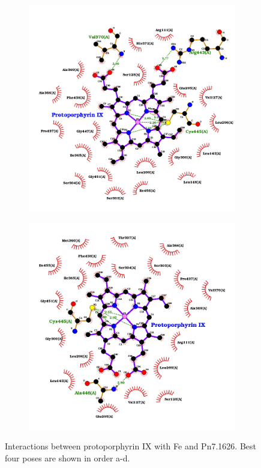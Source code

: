 \documentclass[12pt]{article}
\begin{document}
\begin{figure}[h!]
\begin{subfigure}[h!]{0.35\textwidth}
			\caption{}
		\end{subfigure}
		\hfill
		\begin{subfigure}[h!]{0.35\textwidth}
			\hspace{2cm}
			\includegraphics[width=\textwidth]{../5/propose/Dock/best3.png}
			\caption{}
		\end{subfigure}
		\hfill
		\begin{subfigure}[h!]{0.35\textwidth}
			\hspace{-2cm}
			\includegraphics[width=\textwidth]{../5/propose/Dock/best4.png}
			\caption{}
		\end{subfigure}
		\hfill
		\caption[Interactions between protoporphyrin IX with Fe and Pn7.1626.]{Interactions between protoporphyrin IX with Fe and Pn7.1626. Best four poses are shown in order a-d.}
		\label{fig5p_3}
	\end{figure}
\end{document}
